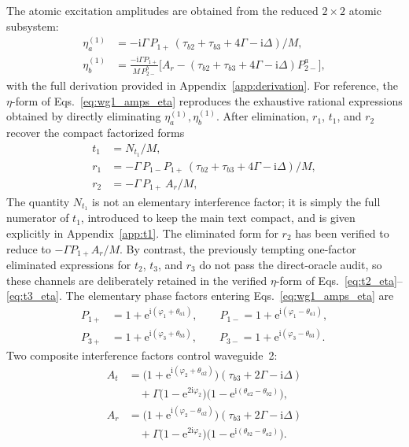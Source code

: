 \documentclass[aps,pra,reprint,superscriptaddress,nofootinbib,longbibliography,floatfix]{revtex4-2}
\newcommand{\ii}{\mathrm{i}}
\newcommand{\ee}{\mathrm{e}}
\newcommand{\Del}{\Delta}
\newcommand{\Gam}{\Gamma}
\newcommand{\ph}{\varphi}
\newcommand{\thaone}{\theta_{a1}}
\newcommand{\thatwo}{\theta_{a2}}
\newcommand{\thbtwo}{\theta_{b2}}
\newcommand{\thbthree}{\theta_{b3}}
\newcommand{\Poneplus}{P_{1+}}
\newcommand{\Poneminus}{P_{1-}}
\newcommand{\Pthreeplus}{P_{3+}}
\newcommand{\Pthreeminus}{P_{3-}}
\begin{document}
The atomic excitation amplitudes are obtained from the reduced $2\times2$ atomic subsystem:
\begin{subequations}
\label{eq:eta_wg1}
\begin{align}
\eta_a^{(1)} &= -\ii\Gam\,\Poneplus\,(\tau_{b2}+\tau_{b3}+4\Gam-\ii\Del)/M,\\[2pt]
\eta_b^{(1)} &= \frac{-\ii\Gam\Poneplus}{M\,P_{2-}^b}
\bigl[A_r - (\tau_{b2}+\tau_{b3}+4\Gam-\ii\Del)P_{2-}^a\bigr],
\end{align}
\end{subequations}
with the full derivation provided in Appendix~\ref{app:derivation}.
For reference, the $\eta$-form of Eqs.~\eqref{eq:wg1_amps_eta} reproduces the exhaustive rational expressions obtained by directly eliminating $\eta_a^{(1)},\eta_b^{(1)}$. After elimination, $r_1$, $t_1$, and $r_2$ recover the compact factorized forms
\begin{subequations}
\label{eq:wg1_factorized}
\begin{align}
t_1 &= N_{t_1}/M, \label{eq:t1_fact}\\[2pt]
r_1 &= -\Gam\,\Poneminus\Poneplus\,(\tau_{b2}+\tau_{b3}+4\Gam-\ii\Del)/M, \label{eq:r1_fact}\\[2pt]
r_2 &= -\Gam\,\Poneplus\,A_r/M, \label{eq:r2_fact}
\end{align}
\end{subequations}
The quantity $N_{t_1}$ is not an elementary interference factor; it is simply the full numerator of $t_1$, introduced to keep the main text compact, and is given explicitly in Appendix~\ref{app:t1}.
The eliminated form for $r_2$ has been verified to reduce to $-\Gamma\Poneplus A_r/M$.
By contrast, the previously tempting one-factor eliminated expressions for $t_2$, $t_3$, and $r_3$ do not pass the direct-oracle audit, so these channels are deliberately retained in the verified $\eta$-form of Eqs.~\eqref{eq:t2_eta}--\eqref{eq:t3_eta}.
The elementary phase factors entering Eqs.~\eqref{eq:wg1_amps_eta} are
\begin{subequations}
\label{eq:P}
\begin{align}
\Poneplus &= 1 + \ee^{\ii(\ph_1+\thaone)}, \qquad
\Poneminus = 1 + \ee^{\ii(\ph_1-\thaone)},\\
\Pthreeplus &= 1 + \ee^{\ii(\ph_3+\thbthree)}, \qquad
\Pthreeminus = 1 + \ee^{\ii(\ph_3-\thbthree)}.
\end{align}
\end{subequations}
Two composite interference factors control waveguide~2:
\begin{subequations}
\label{eq:AtAr}
\begin{align}
A_t &= \bigl(1+\ee^{\ii(\ph_2+\thatwo)}\bigr)(\tau_{b3}+2\Gam-\ii\Del) \nonumber\\
&\quad + \Gam\bigl(1-\ee^{2\ii\ph_2}\bigr)
        \bigl(1-\ee^{\ii(\thatwo-\thbtwo)}\bigr),\\
A_r &= \bigl(1+\ee^{\ii(\ph_2-\thatwo)}\bigr)(\tau_{b3}+2\Gam-\ii\Del) \nonumber\\
&\quad + \Gam\bigl(1-\ee^{2\ii\ph_2}\bigr)
        \bigl(1-\ee^{\ii(\thbtwo-\thatwo)}\bigr).
\end{align}
\end{subequations}
\end{document}
